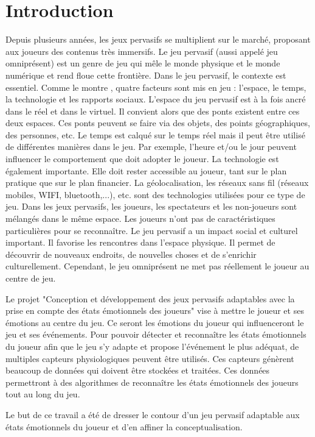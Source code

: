 \documentclass[11pt]{article}
\begin{document}
\section{Introduction}
	Depuis plusieurs années, les jeux pervasifs se multiplient sur le marché, proposant aux joueurs des contenus très immersifs.
	Le jeu pervasif (aussi appelé jeu omniprésent) est un genre de jeu qui mêle le monde physique et le monde numérique et rend floue cette frontière.
	Dans le jeu pervasif, le contexte est essentiel.
	Comme le montre \cite{astic_2013}, quatre facteurs sont mis en jeu : l'espace, le temps, la technologie et les rapports sociaux.
	L'espace du jeu pervasif est à la fois ancré dans le réel et dans le virtuel.
	Il convient alors que des ponts existent entre ces deux espaces.
	Ces ponts peuvent se faire via des objets, des points géographiques, des personnes, etc.
	Le temps est calqué sur le temps réel mais il peut être utilisé de différentes manières dans le jeu.
	Par exemple, l'heure et/ou le jour peuvent influencer le comportement que doit adopter le joueur.
	La technologie est également importante.
	Elle doit rester accessible au joueur, tant sur le plan pratique que sur le plan financier.
	La géolocalisation, les réseaux sans fil (réseaux mobiles, WIFI, bluetooth,...), etc. sont des technologies utilisées pour ce type de jeu.
	Dans les jeux pervasifs, les joueurs, les spectateurs et les non-joueurs sont mélangés dans le même espace.
	Les joueurs n'ont pas de caractéristiques particulières pour se reconnaître.
	Le jeu pervasif a un impact social et culturel important.
	Il favorise les rencontres dans l'espace physique.
	Il permet de découvrir de nouveaux endroits, de nouvelles choses et de s'enrichir culturellement.
	Cependant, le jeu omniprésent ne met pas réellement le joueur au centre de jeu.\par
	Le projet "Conception et développement des jeux pervasifs adaptables avec la prise en compte des états émotionnels des joueurs" vise à mettre le joueur et ses émotions au centre du jeu.
	Ce seront les émotions du joueur qui influenceront le jeu et ses événements.
	Pour pouvoir détecter et reconnaître les états émotionnels du joueur afin que le jeu s'y adapte et propose l'événement le plus adéquat, de multiples capteurs physiologiques peuvent être utilisés.
	Ces capteurs génèrent beaucoup de données qui doivent être stockées et traitées.
	Ces données permettront à des algorithmes de reconnaître les états émotionnels des joueurs tout au long du jeu.\par
	Le but de ce travail a été de dresser le contour d'un jeu pervasif adaptable aux états émotionnels du joueur et d'en affiner la conceptualisation.
\end{document}
